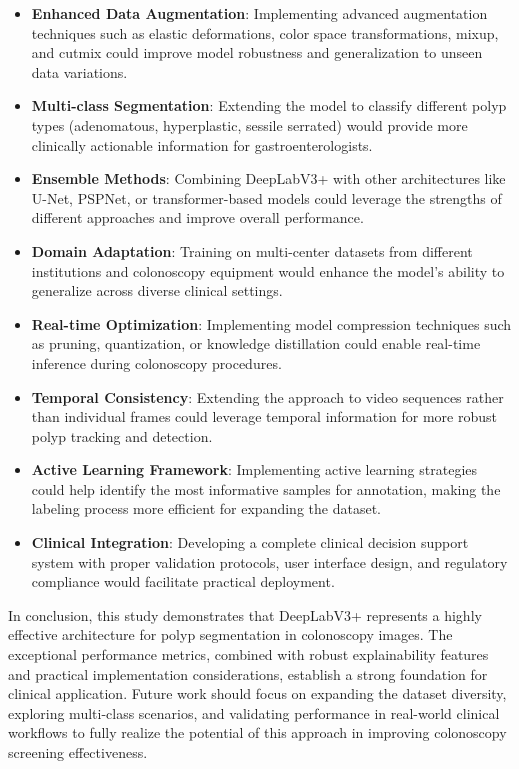 \documentclass[a4paper,12pt]{report}
\begin{document}
\begin{itemize}
    \item \textbf{Enhanced Data Augmentation}: Implementing advanced augmentation techniques such as elastic deformations, color space transformations, mixup, and cutmix could improve model robustness and generalization to unseen data variations.
    \item \textbf{Multi-class Segmentation}: Extending the model to classify different polyp types (adenomatous, hyperplastic, sessile serrated) would provide more clinically actionable information for gastroenterologists.
    \item \textbf{Ensemble Methods}: Combining DeepLabV3+ with other architectures like U-Net, PSPNet, or transformer-based models could leverage the strengths of different approaches and improve overall performance.
    \item \textbf{Domain Adaptation}: Training on multi-center datasets from different institutions and colonoscopy equipment would enhance the model's ability to generalize across diverse clinical settings.
    \item \textbf{Real-time Optimization}: Implementing model compression techniques such as pruning, quantization, or knowledge distillation could enable real-time inference during colonoscopy procedures.
    \item \textbf{Temporal Consistency}: Extending the approach to video sequences rather than individual frames could leverage temporal information for more robust polyp tracking and detection.
    \item \textbf{Active Learning Framework}: Implementing active learning strategies could help identify the most informative samples for annotation, making the labeling process more efficient for expanding the dataset.
    \item \textbf{Clinical Integration}: Developing a complete clinical decision support system with proper validation protocols, user interface design, and regulatory compliance would facilitate practical deployment.
\end{itemize}

In conclusion, this study demonstrates that DeepLabV3+ represents a highly effective architecture for polyp segmentation in colonoscopy images. The exceptional performance metrics, combined with robust explainability features and practical implementation considerations, establish a strong foundation for clinical application. Future work should focus on expanding the dataset diversity, exploring multi-class scenarios, and validating performance in real-world clinical workflows to fully realize the potential of this approach in improving colonoscopy screening effectiveness.
\end{document}
